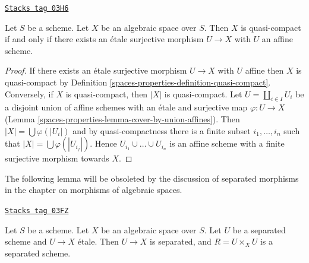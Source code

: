\begin{lemma}
\label{spaces-properties-lemma-quasi-compact-affine-cover}
\href{https://stacks.math.columbia.edu/tag/03H6}{\texttt{Stacks tag 03H6}}

Let $S$ be a scheme.
Let $X$ be an algebraic space over $S$.
Then $X$ is quasi-compact if and only if
there exists an \'etale surjective morphism $U \to X$
with $U$ an affine scheme.
\end{lemma}

\begin{proof}
If there exists an \'etale surjective morphism $U \to X$ with $U$
affine then $X$ is quasi-compact by Definition \ref{spaces-properties-definition-quasi-compact}.
Conversely, if $X$ is quasi-compact, then $|X|$ is quasi-compact.
Let $U = \coprod_{i \in I} U_i$ be a disjoint union of affine schemes
with an \'etale and surjective map $\varphi : U \to X$
(Lemma \ref{spaces-properties-lemma-cover-by-union-affines}).
Then $|X| = \bigcup \varphi(|U_i|)$ and
by quasi-compactness there is a finite subset $i_1, \ldots, i_n$
such that $|X| = \bigcup \varphi(|U_{i_j}|)$. Hence
$U_{i_1} \cup \ldots \cup U_{i_n}$ is an affine scheme with a
finite surjective morphism towards $X$.
\end{proof}

The following lemma will be obsoleted by the discussion of
separated morphisms in the chapter on morphisms of algebraic spaces.

\begin{lemma}
\label{spaces-properties-lemma-separated-cover}
\href{https://stacks.math.columbia.edu/tag/03FZ}{\texttt{Stacks tag 03FZ}}

Let $S$ be a scheme.
Let $X$ be an algebraic space over $S$.
Let $U$ be a separated scheme and $U \to X$ \'etale.
Then $U \to X$ is separated, and $R = U \times_X U$ is a separated scheme.
\end{lemma}

